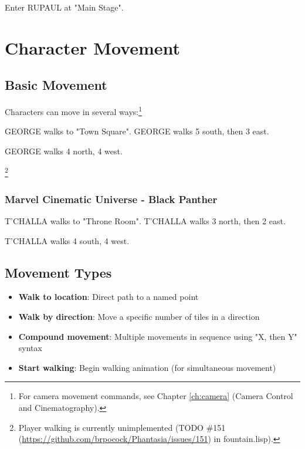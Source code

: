 \documentclass[11pt,letterpaper,oldstylefigures]{memoir}
\newcommand{\stagedir}[1]{#1\par\vspace{1\baselineskip}}
\newenvironment{FountainExample}
  {\begingroup
  \ttfamily\small
   \setlength{\parindent}{0pt}
  \setlength{\parskip}{0.5em}
  \allowdisplaybreaks
  \setlength{\displaywidowpenalty}{0}
  \setlength{\widowpenalty}{0}
  \setlength{\clubpenalty}{0}
  \setlength{\interlinepenalty}{0}
}
  {\endgroup}
\newcommand{\paragraphbreak}{\vspace{0.5em}}
\begin{document}
\begin{FountainExample}
\stagedir{Enter RUPAUL at "Main Stage".}
\end{FountainExample}

\section{Character Movement}
\label{sec:character-movement}

\subsection{Basic Movement}

Characters can move in several ways:\footnote{For camera movement commands, see Chapter \ref{ch:camera} (Camera Control and Cinematography).}

\begin{FountainExample}
\stagedir{GEORGE walks to "Town Square". GEORGE walks 5 south, then 3 east.}
\stagedir{GEORGE walks 4 north, 4 west.}
\end{FountainExample}

\footnote{Player walking is currently unimplemented (TODO \#151 (\href{https://github.com/brpocock/Phantasia/issues/151}{https://github.com/brpocock/Phantasia/issues/151}) in fountain.lisp).}

\paragraphbreak

\subsubsection*{Marvel Cinematic Universe - Black Panther}
\label{ex:marvel-cinematic-universe-black-panther}

\begin{FountainExample}
\stagedir{T'CHALLA walks to "Throne Room". T'CHALLA walks 3 north, then 2 east.}
\stagedir{T'CHALLA walks 4 south, 4 west.}
\end{FountainExample}

\subsection{Movement Types}
\paragraphbreak

\begin{itemize}
\item \textbf{Walk to location}: Direct path to a named point
\item \textbf{Walk by direction}: Move a specific number of tiles in a direction
\item \textbf{Compound movement}: Multiple movements in sequence using "X, then Y" syntax
\item \textbf{Start walking}: Begin walking animation (for simultaneous movement)
\end{itemize}
\end{document}
